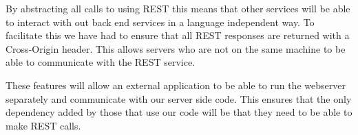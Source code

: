 By abstracting all calls to using REST this means that other services will be able to interact with out back end services in a language independent way. To facilitate this we have had to ensure that all REST responses are returned with a Cross-Origin header. This allows servers who are not on the same machine to be able to communicate with the REST service.

These features will allow an external application to be able to run the webserver separately and communicate with our server side code. This ensures that the only dependency added by those that use our code will be that they need to be able to make REST calls.